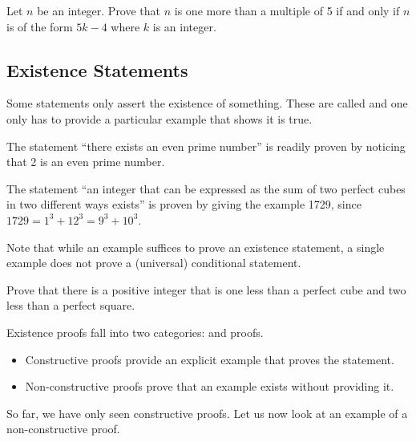 \begin{exercise}
    Let $n$ be an integer. Prove that $n$ is one more than a multiple of 5 if and only if $n$ is of the form $5k - 4$ where $k$ is an integer.
\end{exercise}

\subsection{Existence Statements}
Some statements only assert the existence of something. These are called  and one only has to provide a particular example that shows it is true.
\begin{example}
    The statement ``there exists an even prime number'' is readily proven by noticing that 2 is an even prime number.
\end{example}

\begin{example}
    The statement ``an integer that can be expressed as the sum of two perfect cubes in two different ways exists'' is proven by giving the example 1729, since $1729 = 1^3 + 12^3 = 9^3 + 10^3$.
\end{example}

Note that while an example suffices to prove an existence statement, a single example does not prove a (universal) conditional statement.

\begin{exercise}
    Prove that there is a positive integer that is one less than a perfect cube and two less than a perfect square.
\end{exercise}

Existence proofs fall into two categories:  and  proofs.
\begin{itemize}
    \item Constructive proofs provide an explicit example that proves the statement.
    \item Non-constructive proofs prove that an example exists without providing it.
\end{itemize}
So far, we have only seen constructive proofs. Let us now look at an example of a non-constructive proof.

